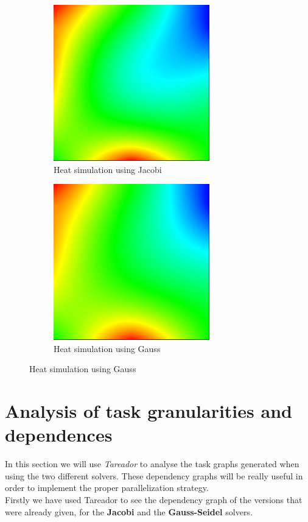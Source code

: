 \documentclass[12]{article}
\begin{document}
\begin{figure}[H]
\begin{subfigure}{.4\textwidth}
    \centering
    \includegraphics[scale=0.4]{images/heat-jacobi.png}
    \caption{Heat simulation using Jacobi}
\end{subfigure}
\begin{subfigure}{.4\textwidth}
    \centering
    \includegraphics[scale=0.4]{images/heat-gauss.png}
    \caption{Heat simulation using Gauss}
\end{subfigure}
\end{figure}


\section{Analysis of task granularities and dependences}
In this section we will use \textit{Tareador} to analyse the task graphs generated when using the two different solvers. These dependency graphs will be really useful in order to implement the proper parallelization strategy.
\\

Firstly we have used Tareador to see the dependency graph of the versions that were already given, for the \textbf{Jacobi} and the \textbf{Gauss-Seidel} solvers.
\end{document}
